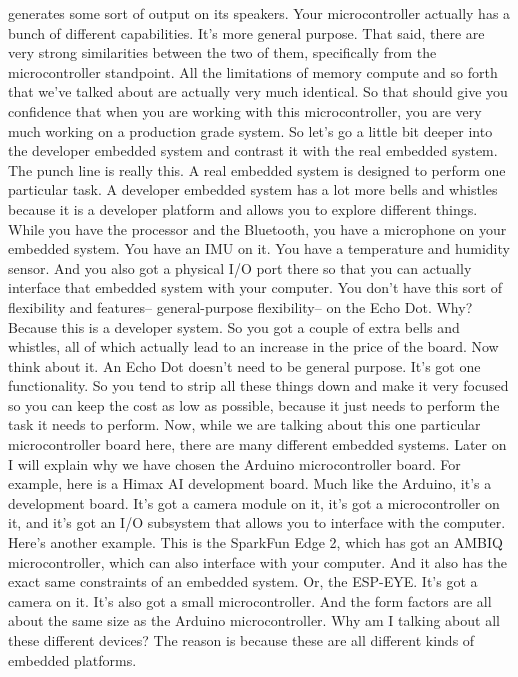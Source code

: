 generates some sort of output on its speakers.
Your microcontroller actually has a bunch of different capabilities.
It's more general purpose.
That said, there are very strong similarities between the two of them,
specifically from the microcontroller standpoint.
All the limitations of memory compute and so forth that we've talked about
are actually very much identical.
So that should give you confidence that when
you are working with this microcontroller,
you are very much working on a production grade system.
So let's go a little bit deeper into the developer embedded system
and contrast it with the real embedded system.
The punch line is really this.
A real embedded system is designed to perform one particular task.
A developer embedded system has a lot more bells and whistles
because it is a developer platform and allows you to explore different things.
While you have the processor and the Bluetooth,
you have a microphone on your embedded system.
You have an IMU on it.
You have a temperature and humidity sensor.
And you also got a physical I/O port there so
that you can actually interface that embedded system with your computer.
You don't have this sort of flexibility and features--
general-purpose flexibility-- on the Echo Dot.
Why?
Because this is a developer system.
So you got a couple of extra bells and whistles, all of which
actually lead to an increase in the price of the board.
Now think about it.
An Echo Dot doesn't need to be general purpose.
It's got one functionality.
So you tend to strip all these things down and make it very focused
so you can keep the cost as low as possible,
because it just needs to perform the task it needs to perform.
Now, while we are talking about this one particular microcontroller board here,
there are many different embedded systems.
Later on I will explain why we have chosen the Arduino microcontroller
board.
For example, here is a Himax AI development board.
Much like the Arduino, it's a development board.
It's got a camera module on it, it's got a microcontroller on it,
and it's got an I/O subsystem that allows
you to interface with the computer.
Here's another example.
This is the SparkFun Edge 2, which has got an AMBIQ microcontroller, which
can also interface with your computer.
And it also has the exact same constraints of an embedded system.
Or, the ESP-EYE.
It's got a camera on it.
It's also got a small microcontroller.
And the form factors are all about the same size
as the Arduino microcontroller.
Why am I talking about all these different devices?
The reason is because these are all different kinds of embedded platforms.
